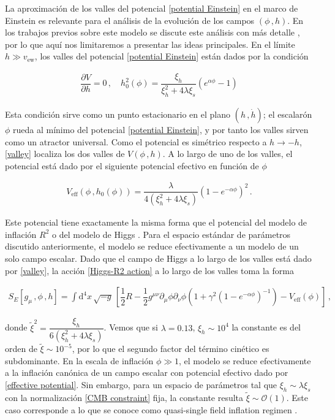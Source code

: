 \documentclass[12pt,a4paper,english,nofootinbib]{revtex4}
\newcommand{\dif}{\mathrm{d}}
\newcommand{\beq}{\begin{eqnarray}}
\newcommand{\enq}{\end{eqnarray}}
\begin{document}
La aproximación de los valles del potencial \eqref{potential Einstein} en el marco de Einstein es relevante para el análisis de la evolución de los campos $(\phi\,,h)$. En los trabajos previos sobre este modelo se discute este análisis con más detalle \cite{Wang2017,GUNDHI2020,He2018}, por lo que aquí nos limitaremos a presentar las ideas principales. En el límite $h\gg v_\text{ew}$, los valles del potencial \eqref{potential Einstein} están dados por la condición

\beq
\dfrac{\partial V}{\partial h} = 0\,,\quad h_0^2(\phi) = \dfrac{\xi_h}{\xi_h^2 + 4\lambda \xi_s}(e^{\alpha \phi} - 1 )
\label{valley}
\enq 

Esta condición sirve como un punto estacionario en el plano $(h\,,\dot{h})$; el escalarón $\phi$ rueda al mínimo del potencial \eqref{potential Einstein}, y por tanto los valles sirven como un atractor universal. Como el potencial es simétrico respecto a $h\to - h$, \eqref{valley} localiza los dos valles de $V(\phi\,,h)$. A lo largo de uno de los valles, el potencial está dado por el siguiente potencial efectivo en función de $\phi$

\beq 
    V_\text{eff}(\phi\,,h_0(\phi)) = \dfrac{ \lambda}{4(\xi_h^2 + 4\lambda\xi_s)}(1 - e^{-\alpha\phi})^2\,.
    \label{effective potential}
\enq 

Este potencial tiene exactamente la misma forma que el potencial del modelo de inflación $R^2$ o del modelo de Higgs \cite{BEZRUKOV2008}. Para el espacio estándar de parámetros discutido anteriormente, el modelo se reduce efectivamente a un modelo de un solo campo escalar. Dado que el campo de Higgs a lo largo de los valles está dado por \eqref{valley}, la acción \eqref{Higgs-R2 action} a lo largo de los valles toma la forma  

\beq
    S_E[g_\mu\,,\phi\,,h] = \int \dif^4 x\,\sqrt{-g}\,\left[\dfrac{1}{2}R - \dfrac{1}{2}g^{\mu\nu}\partial_\mu\phi\partial_\nu\phi \left(1 + \gamma^2(1 - e^{-\alpha\phi})^{-1}\right) -V_\text{eff}(\phi)\right]\,,
\enq 

donde $\tilde{\xi}^2 = \dfrac{\xi_h}{6(\xi_h^2 + 4\lambda\xi_s)}$. Vemos que si $\lambda = 0.13$, $\xi_h \sim 10^4$ la constante es del orden de $\tilde{\xi} \sim 10^{-5}$, por lo que el segundo factor del término cinético es subdominante. En la escala de inflación $\phi \gg 1$, el modelo se reduce efectivamente a la inflación canónica de un campo escalar con potencial efectivo dado por \eqref{effective potential}.  Sin embargo, para un espacio de parámetros tal que $\xi_h \sim \lambda\xi_s$ con la normalización \eqref{CMB constraint} fija, la constante resulta $\tilde{\xi}\sim \mathcal{O}(1)$. Este caso corresponde a lo que se conoce como quasi-single field inflation regimen \cite{chen2010prd,Chen_2010}.
\end{document}
